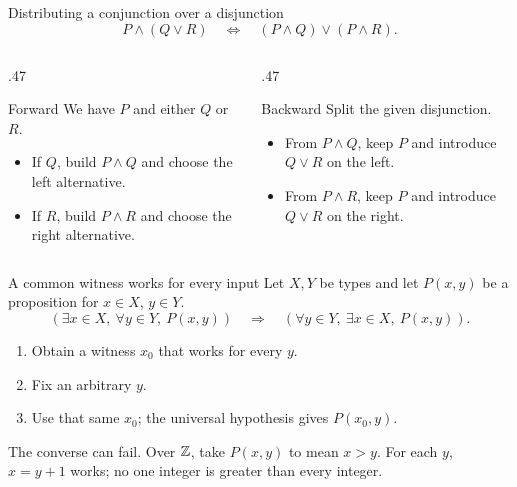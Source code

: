 \begin{frame}{Distributing a conjunction over a disjunction}
\[
P\land(Q\lor R)\quad\Longleftrightarrow\quad
(P\land Q)\lor(P\land R).
\]
\begin{columns}[T]
\begin{column}{.47\textwidth}
\begin{block}{Forward}
We have $P$ and either $Q$ or $R$.
\begin{itemize}
\item If $Q$, build $P\land Q$ and choose the left alternative.
\item If $R$, build $P\land R$ and choose the right alternative.
\end{itemize}
\end{block}
\end{column}
\begin{column}{.47\textwidth}
\begin{block}{Backward}
Split the given disjunction.
\begin{itemize}
\item From $P\land Q$, keep $P$ and introduce $Q\lor R$ on the left.
\item From $P\land R$, keep $P$ and introduce $Q\lor R$ on the right.
\end{itemize}
\end{block}
\end{column}
\end{columns}
\end{frame}

\begin{frame}{A common witness works for every input}
Let $X,Y$ be types and let $P(x,y)$ be a proposition for $x\in X$, $y\in Y$.
\[
(\exists x\in X,\ \forall y\in Y,\ P(x,y))
\quad\Longrightarrow\quad
(\forall y\in Y,\ \exists x\in X,\ P(x,y)).
\]
\begin{enumerate}
\item Obtain a witness $x_0$ that works for every $y$.
\item Fix an arbitrary $y$.
\item Use that same $x_0$; the universal hypothesis gives $P(x_0,y)$.
\end{enumerate}
The converse can fail. Over $\mathbb{Z}$, take $P(x,y)$ to mean $x>y$.
For each $y$, $x=y+1$ works; no one integer is greater than every integer.
\end{frame}

